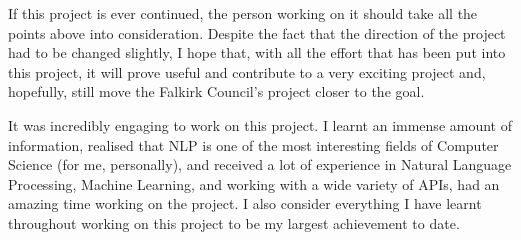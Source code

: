 If this project is ever continued, the person working on it should take all the points above into consideration. Despite the fact that the direction of the project had to be changed slightly, I hope that, with all the effort that has been put into this project, it will prove useful and contribute to a very exciting project and, hopefully, still move the Falkirk Council's project closer to the goal. 

It was incredibly engaging to work on this project. I learnt an immense amount of information, realised that NLP is one of the most interesting fields of Computer Science (for me, personally), and received a lot of experience in Natural Language Processing, Machine Learning, and working with a wide variety of APIs, had an amazing time working on the project. I also consider everything I have learnt throughout working on this project to be my largest achievement to date. 